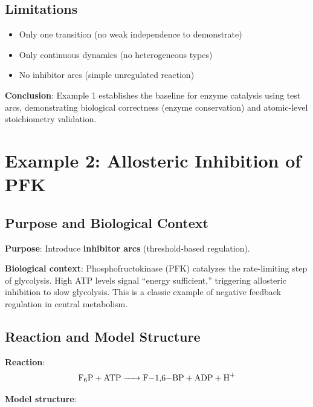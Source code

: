 \subsection{Limitations}
\label{subsec:hex-limitations}

\begin{itemize}
    \item Only one transition (no weak independence to demonstrate)
    \item Only continuous dynamics (no heterogeneous types)
    \item No inhibitor arcs (simple unregulated reaction)
\end{itemize}

\textbf{Conclusion}: Example 1 establishes the baseline for enzyme catalysis using test arcs, demonstrating biological correctness (enzyme conservation) and atomic-level stoichiometry validation.

\section{Example 2: Allosteric Inhibition of PFK}
\label{sec:example-pfk}

\subsection{Purpose and Biological Context}
\label{subsec:pfk-purpose}

\textbf{Purpose}: Introduce \textbf{inhibitor arcs} (threshold-based regulation).

\textbf{Biological context}: Phosphofructokinase (PFK) catalyzes the rate-limiting step of glycolysis. High ATP levels signal ``energy sufficient,'' triggering allosteric inhibition to slow glycolysis. This is a classic example of negative feedback regulation in central metabolism.

\subsection{Reaction and Model Structure}
\label{subsec:pfk-structure}

\textbf{Reaction}:
\begin{equation}
\ce{F6P + ATP -> F-1,6-BP + ADP + H+}
\end{equation}

\textbf{Model structure}:

